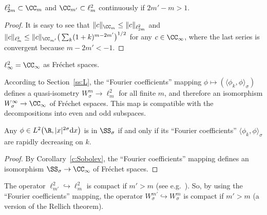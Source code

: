 \begin{Lemma}\label{l:ell 2 2m subset CC m}
  $\ell^2_{2m}\subset\CC_m$ and $\CC_{m'}\subset\ell^2_m$ continuously if $2m'-m>1$.
\end{Lemma}

\begin{proof}
  It is easy to see that $\|c\|_{\CC_m}\le\|c\|_{\ell^2_{2m}}$ and $ \|c\|_{\ell^2_m}\le\|c\|_{\CC_{m'}}\big(\sum_k(1+k)^{m-2m'}\big)^{1/2}$ for any $c\in\CC_\infty$, where the last series is convergent because $m-2m'<-1$.
\end{proof}

\begin{Corollary}\label{c:ell 2 infty=CC}
  $\ell^2_\infty=\CC_\infty$ as Fr\'echet spaces.
\end{Corollary}

According to Section~\ref{ss:L}, the ``Fourier coef\/f\/icients'' mapping $\phi\mapsto(\langle\phi_k,\phi\rangle_\sigma)$ def\/ines a quasi-isometry $W_\sigma^m\to\ell^2_m$ for all f\/inite $m$, and therefore an isomorphism $W_\sigma^\infty\to\CC_\infty$ of Fr\'echet espaces. This map is compatible with the decompositions into even and odd subspaces.

\begin{Corollary}\label{c:SS_sigma, rapidly degreasing Fourier coefficients}
  Any $\phi\in L^2\big(\R,|x|^{2\sigma}{\rm d}x\big)$ is in $\SS_\sigma$ if and only if its ``Fourier coefficients'' $\langle\phi_k,\phi\rangle_\sigma$ are rapidly decreasing on $k$.
\end{Corollary}

\begin{proof}
  By Corollary~\ref{c:Sobolev}, the ``Fourier coef\/f\/icients'' mapping def\/ines an isomorphism $\SS_\sigma\to\CC_\infty$ of Fr\'echet spaces.
\end{proof}

The operator $\ell^2_{m'}\hookrightarrow\ell^2_m$ is compact if $m'>m$ (see e.g.\ \cite[Theorem 5.8]{Roe1998}). So, by using  the ``Fourier coef\/f\/icients'' mapping, the operator $W_\sigma^{m'}\hookrightarrow W_\sigma^m$ is compact if $m'>m$ (a version of the Rellich theorem).

